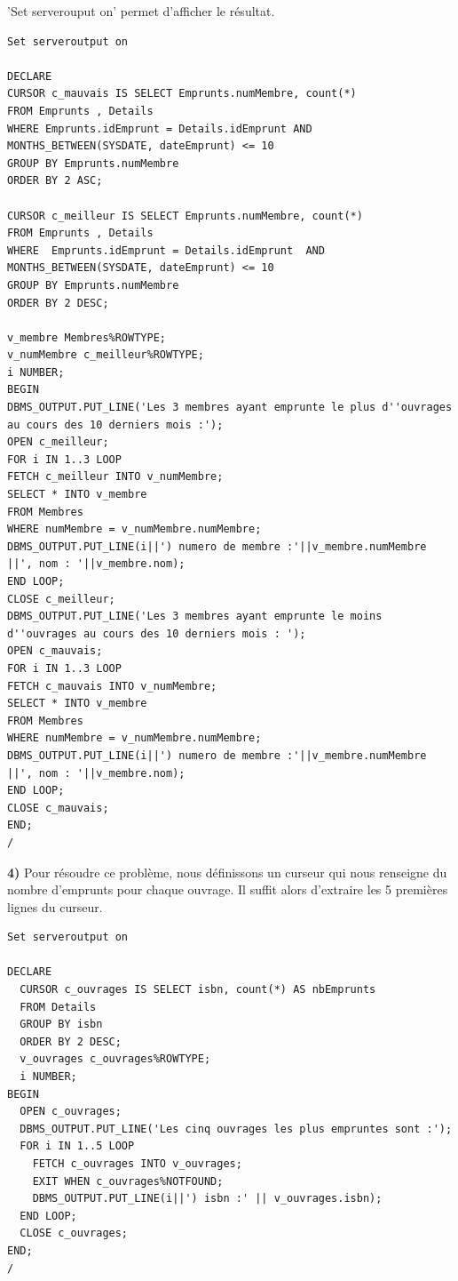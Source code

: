 \documentclass[a4paper,12pt]{article}
\begin{document}
      'Set serverouput on' permet d'afficher le résultat.
      
      \clearpage
      
      \begin{lstlisting}
Set serveroutput on

DECLARE
CURSOR c_mauvais IS SELECT Emprunts.numMembre, count(*)
FROM Emprunts , Details 
WHERE Emprunts.idEmprunt = Details.idEmprunt AND MONTHS_BETWEEN(SYSDATE, dateEmprunt) <= 10 
GROUP BY Emprunts.numMembre
ORDER BY 2 ASC;

CURSOR c_meilleur IS SELECT Emprunts.numMembre, count(*)
FROM Emprunts , Details 
WHERE  Emprunts.idEmprunt = Details.idEmprunt  AND MONTHS_BETWEEN(SYSDATE, dateEmprunt) <= 10 
GROUP BY Emprunts.numMembre
ORDER BY 2 DESC;

v_membre Membres%ROWTYPE;
v_numMembre c_meilleur%ROWTYPE;
i NUMBER;
BEGIN
DBMS_OUTPUT.PUT_LINE('Les 3 membres ayant emprunte le plus d''ouvrages au cours des 10 derniers mois :');
OPEN c_meilleur;
FOR i IN 1..3 LOOP
FETCH c_meilleur INTO v_numMembre;
SELECT * INTO v_membre
FROM Membres
WHERE numMembre = v_numMembre.numMembre;
DBMS_OUTPUT.PUT_LINE(i||') numero de membre :'||v_membre.numMembre ||', nom : '||v_membre.nom);
END LOOP;
CLOSE c_meilleur;
DBMS_OUTPUT.PUT_LINE('Les 3 membres ayant emprunte le moins d''ouvrages au cours des 10 derniers mois : ');
OPEN c_mauvais;
FOR i IN 1..3 LOOP
FETCH c_mauvais INTO v_numMembre;
SELECT * INTO v_membre
FROM Membres
WHERE numMembre = v_numMembre.numMembre;
DBMS_OUTPUT.PUT_LINE(i||') numero de membre :'||v_membre.numMembre ||', nom : '||v_membre.nom);
END LOOP;
CLOSE c_mauvais;
END;
/

      \end{lstlisting}
      \clearpage
      \textbf {4)} Pour résoudre ce problème, nous définissons un curseur qui nous renseigne du nombre d'emprunts pour chaque ouvrage. Il suffit alors d'extraire les 5 premières lignes du curseur.
      
      \begin{lstlisting}
Set serveroutput on

DECLARE
  CURSOR c_ouvrages IS SELECT isbn, count(*) AS nbEmprunts
  FROM Details
  GROUP BY isbn
  ORDER BY 2 DESC;
  v_ouvrages c_ouvrages%ROWTYPE;
  i NUMBER;
BEGIN 
  OPEN c_ouvrages;
  DBMS_OUTPUT.PUT_LINE('Les cinq ouvrages les plus empruntes sont :');
  FOR i IN 1..5 LOOP
    FETCH c_ouvrages INTO v_ouvrages;
    EXIT WHEN c_ouvrages%NOTFOUND;
    DBMS_OUTPUT.PUT_LINE(i||') isbn :' || v_ouvrages.isbn);
  END LOOP;
  CLOSE c_ouvrages;
END;
/

      \end{lstlisting}
      
\end{document}
